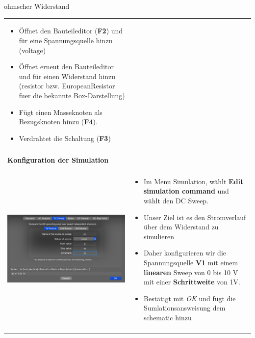 \begin{frame}[t]{ohmscher Widerstand}
\begin{spacing}{0.9}
\begin{tiny}
\begin{table}[h!]
\begin{tabular}{p{3cm} p{7cm}}
\begin{minipage}{.7\textwidth}
\begin{itemize}
          \item Öffnet den Bauteileditor (\textbf{F2}) und für eine Spannungsquelle hinzu (voltage)
          \item Öffnet erneut den Bauteileditor und für einen Widerstand hinzu (resistor bzw. EuropeanResistor fuer die bekannte Box-Darstellung)
          \item Fügt einen Masseknoten als Bezugsknoten hinzu (\textbf{F4}).
          \item Verdrahtet die Schaltung (\textbf{F3})
        \end{itemize}
        \end{minipage} 
        \\
         & \\
         \hline
         \textbf{Konfiguration der Simulation} & \\
         \hline \\
         \begin{minipage}{.3\textwidth}
          \includegraphics[width=\linewidth]{pictures/simulationcmd_1.png}
        \end{minipage} 
        & 
        \begin{minipage}{.7\textwidth}
        \begin{itemize}
          \item Im Menu Simulation, wählt \textbf{Edit simulation command} und wählt den DC Sweep. 
          \item Unser Ziel ist es den Stromverlauf über dem Widerstand zu simulieren
          \item Daher konfigurieren wir die Spannungsquelle \textbf{V1} mit einem \textbf{linearen} Sweep von 0 bis 10 V mit einer \textbf{Schrittweite} von 1V.
          \item Bestätigt mit \textit{OK} und fügt die Sumlationsansweisung dem schematic hinzu
        \end{itemize}
        \end{minipage} 
        \\
         & \\
         \hline
      \end{tabular}
    

\end{table}
\end{tiny}
\end{spacing}
\end{frame}
